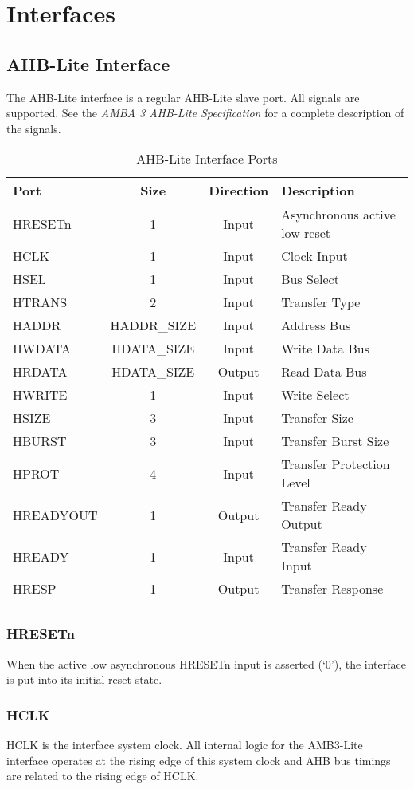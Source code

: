 \chapter{Interfaces} \label{interfaces}

\section{AHB-Lite Interface}\label{ahb-lite-interface}

The AHB-Lite interface is a regular AHB-Lite slave port. All signals are
supported. See the \emph{AMBA 3 AHB-Lite Specification} for a complete
description of the signals.

\begin{longtable}[]{@{}lccl@{}}
\toprule
Port & Size & Direction & Description\tabularnewline
\midrule
\endhead
HRESETn & 1 & Input & Asynchronous active low reset\tabularnewline
HCLK & 1 & Input & Clock Input\tabularnewline
HSEL & 1 & Input & Bus Select\tabularnewline
HTRANS & 2 & Input & Transfer Type\tabularnewline
HADDR & HADDR\_SIZE & Input & Address Bus\tabularnewline
HWDATA & HDATA\_SIZE & Input & Write Data Bus\tabularnewline
HRDATA & HDATA\_SIZE & Output & Read Data Bus\tabularnewline
HWRITE & 1 & Input & Write Select\tabularnewline
HSIZE & 3 & Input & Transfer Size\tabularnewline
HBURST & 3 & Input & Transfer Burst Size\tabularnewline
HPROT & 4 & Input & Transfer Protection Level\tabularnewline
HREADYOUT & 1 & Output & Transfer Ready Output\tabularnewline
HREADY & 1 & Input & Transfer Ready Input\tabularnewline
HRESP & 1 & Output & Transfer Response\tabularnewline
\bottomrule
\caption{AHB-Lite Interface
	Ports}
\end{longtable}

\subsection{HRESETn}\label{hresetn}

When the active low asynchronous HRESETn input is asserted (`0'), the
interface is put into its initial reset state.

\subsection{HCLK}\label{hclk}

HCLK is the interface system clock. All internal logic for the AMB3-Lite
interface operates at the rising edge of this system clock and AHB bus
timings are related to the rising edge of HCLK.

